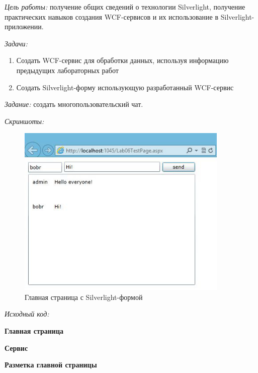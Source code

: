 \documentclass[pscyr, nonums]{hedlab}
\date{}
\begin{document}
    \makeheader
    \emph{Цель работы:} получение общих сведений о технологии Silverlight, получение практических навыков создания WCF-сервисов и их использование в
    Silverlight-приложении.

    \emph{Задачи:}
    \begin{enumerate}\itemsep-5pt
        \item Создать WCF-сервис для обработки данных, используя информацию предыдущих лабораторных работ
        \item Создать Silverlight-форму использующую разработанный WCF-сервис
    \end{enumerate}

    \emph{Задание:} создать многопользовательский чат.

    \emph{Скриншоты:}
    \begin{figure}[ht]
        \center
        \includegraphics[width=0.9\textwidth]{Lab06_01}
        \caption{Главная страница с Silverlight-формой}
    \end{figure}

    \pagebreak

    \emph{Исходный код:}
    \begin{center}
        \textbf{Главная страница}
    \end{center}
    

    \begin{center}
        \textbf{Сервис}
    \end{center}
    

    \begin{center}
        \textbf{Разметка главной страницы}
    \end{center}
    
\end{document}
